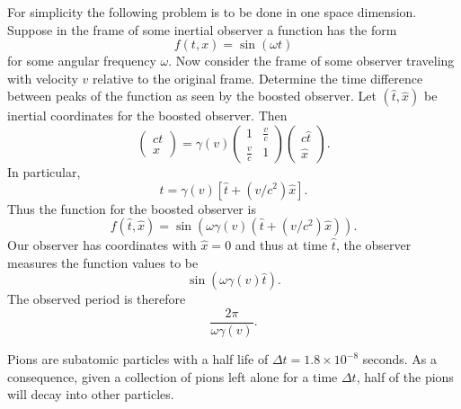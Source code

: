\documentclass[minion]{homework}
\begin{document}
\begin{aproblems}
\hproblem For simplicity the following problem is to be done in one space dimension.
Suppose in the frame of some inertial observer a function has the form
\begin{equation}
f(t,x) = \sin(\omega t)
\end{equation}
for some angular frequency $\omega$.  Now consider the frame of some observer traveling
with velocity $v$ relative to the original frame.  Determine the time difference between peaks
of the function as seen by the boosted observer.
\solution
Let $(\hat t, \hat x)$ be inertial coordinates for the boosted observer.  Then
\begin{equation}
\begin{pmatrix} ct \\ x \end{pmatrix} = \gamma(v) \begin{pmatrix} 1 & \frac{v}{c} \\ \frac{v}{c} & 1\end{pmatrix} \begin{pmatrix} c\hat t \\ \hat x \end{pmatrix}.
\end{equation}
In particular,
\begin{equation}
t = \gamma(v) \left[ \hat t + (v/c^2) \hat x\right].
\end{equation}
Thus the function for the boosted observer is
\begin{equation}
f(\hat t, \hat x) = \sin(\omega \gamma(v) ( \hat t + (v/c^2) \hat x)).
\end{equation}
Our observer has coordinates with $\hat x = 0$ and thus at time $\hat t$, the
observer measures the function values to be
\begin{equation}
\sin(\omega \gamma(v)\hat t).
\end{equation}
The observed period is therefore
\begin{equation}
\frac{2\pi}{\omega\gamma(v)}.
\end{equation}


\hproblem Pions are subatomic particles with a half life of $\Delta t=1.8\times10^{-8}$ seconds.  As a consequence, given a collection of pions left alone for a time $\Delta t$, half
of the pions will decay into other particles.


\end{aproblems}
\end{document}

